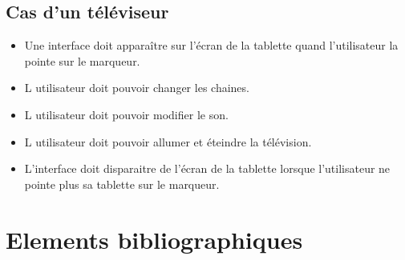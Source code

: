 \documentclass[12pt,a4paper]{article}
\begin{document}
\subsection{Cas d'un téléviseur}
\begin{itemize} 
  \item Une interface doit apparaître sur l'écran de la tablette quand l'utilisateur la pointe sur le marqueur.
  \item L utilisateur doit pouvoir changer les chaines.
  \item L utilisateur doit pouvoir modifier le son.
  \item L utilisateur doit pouvoir allumer et éteindre la télévision.
  \item L'interface doit disparaitre de l'écran de la tablette lorsque l'utilisateur ne pointe plus sa tablette sur le marqueur.
\end{itemize}

\newpage
\section{Elements bibliographiques}
\end{document}
